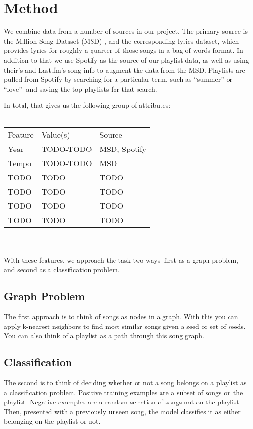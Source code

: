 \documentclass[10pt,journal,compsoc]{IEEEtran}
\begin{document}
\section{Method}
We combine data from a number of sources in our project. The primary source is the Million Song Dataset (MSD) \cite{msd}, and the corresponding lyrics dataset, which provides lyrics for roughly a quarter of those songs in a bag-of-words format. In addition to that we use Spotify \cite{spotify} as the source of our playlist data, as well as using their's and Last.fm's \cite{lastfm} song info to augment the data from the MSD. Playlists are pulled from Spotify by searching for a particular term, such as ``summer'' or ``love'', and saving the top playlists for that search.

In total, that gives us the following group of attributes:
\\\\
\begin{tabular}{lll}
Feature    & Value(s)       & Source          \\
Year       & TODO-TODO      & MSD, Spotify    \\
Tempo      & TODO-TODO      & MSD             \\
TODO       & TODO           & TODO            \\
TODO       & TODO           & TODO            \\
TODO       & TODO           & TODO            \\
TODO       & TODO           & TODO            \\
\end{tabular}
\\\\
With these features, we approach the task two ways; first as a graph problem, and second as a classification problem.

\subsection{Graph Problem}
The first approach is to think of songs as nodes in a graph. With this you can apply k-nearest neighbors to find most similar songs given a seed or set of seeds. You can also think of a playlist as a path through this song graph. \cite{Alghoniemy01anetwork}

\subsection{Classification}
The second is to think of deciding whether or not a song belongs on a playlist as a classification problem. Positive training examples are a subset of songs on the playlist. Negative examples are a random selection of songs not on the playlist. Then, presented with a previously unseen song, the model classifies it as either belonging on the playlist or not.
\end{document}
